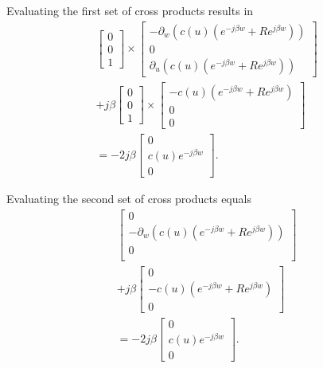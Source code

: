 Evaluating the first set of cross products results in 
\begin{multline}
    \begin{bmatrix}
        0 \\ 0 \\ 1
    \end{bmatrix} \times
    \begin{bmatrix}
        -\partial_w(c(u)(e^{-j\beta w}+Re^{j\beta w})) \\
        0 \\
        \partial_u(c(u)(e^{-j\beta w}+Re^{j\beta w}))
    \end{bmatrix} \\ +j\beta 
    \begin{bmatrix}
        0 \\ 0 \\ 1
    \end{bmatrix} \times
    \begin{bmatrix}
        -c(u)(e^{-j\beta w}+Re^{j\beta w}) \\
        0\\
        0
    \end{bmatrix} \\ =-2j\beta
    \begin{bmatrix}
        0 \\
        c(u)e^{-j\beta w}\\
        0
    \end{bmatrix}.
\end{multline}

Evaluating the second set of cross products equals
\begin{multline}
    \begin{bmatrix}
        0 \\
        -\partial_w(c(u)(e^{-j\beta w}+Re^{j\beta w})) \\
        0 \\ 
    \end{bmatrix} \\ +j\beta 
    \begin{bmatrix}
        0  \\
        -c(u)(e^{-j\beta w}+Re^{j\beta w})\\
        0
    \end{bmatrix} \\ =-2j\beta
    \begin{bmatrix}
        0 \\
        c(u)e^{-j\beta w}\\
        0
    \end{bmatrix}.
\end{multline}

